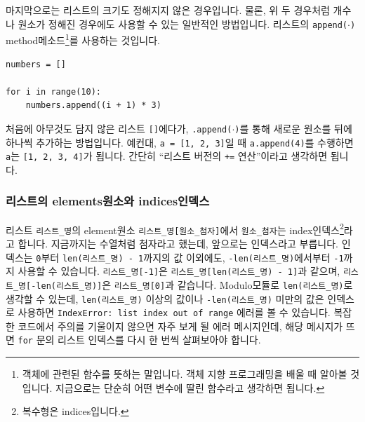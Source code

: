 \documentclass[../main.tex]{subfiles}
\begin{document}
마지막으로는 리스트의 크기도 정해지지 않은 경우입니다.
물론, 위 두 경우처럼 개수나 원소가 정해진 경우에도 사용할 수 있는 일반적인 방법입니다.
리스트의 \texttt{append($\cdot$)} method메소드\footnote{객체에 관련된 함수를 뜻하는 말입니다. 객체 지향 프로그래밍을 배울 때 알아볼 것입니다. 지금으로는 단순히 어떤 변수에 딸린 함수라고 생각하면 됩니다.}를 사용하는 것입니다.
\begin{verbatim}
numbers = []

for i in range(10):
    numbers.append((i + 1) * 3)
\end{verbatim}
처음에 아무것도 담지 않은 리스트 \texttt{[]}에다가, \texttt{.append($\cdot$)}를 통해 새로운 원소를 뒤에 하나씩 추가하는 방법입니다.
예컨대, \texttt{a = [1, 2, 3]}일 때 \texttt{a.append(4)}를 수행하면 \texttt{a}는 \texttt{[1, 2, 3, 4]}가 됩니다.
간단히 ``리스트 버전의 \texttt{+=} 연산''이라고 생각하면 됩니다.

\subsubsection{리스트의 elements원소와 indices인덱스}
리스트 \texttt{리스트\_명}의 element원소 \texttt{리스트\_명[원소\_첨자]}에서 \texttt{원소\_첨자}는 index인덱스\footnote{복수형은 indices입니다.}라고 합니다.
지금까지는 수열처럼 첨자라고 했는데, 앞으로는 인덱스라고 부릅니다.
인덱스는 \texttt{0}부터 \texttt{len(리스트\_명) - 1}까지의 값 이외에도, \texttt{-len(리스트\_명)}에서부터 \texttt{-1}까지 사용할 수 있습니다.
\texttt{리스트\_명[-1]}은 \texttt{리스트\_명[len(리스트\_명) - 1]}과 같으며, \texttt{리스트\_명[-len(리스트\_명)]}은 \texttt{리스트\_명[0]}과 같습니다.
Modulo모듈로 \texttt{len(리스트\_명)}로 생각할 수 있는데, \texttt{len(리스트\_명)} 이상의 값이나 \texttt{-len(리스트\_명)} 미만의 값은 인덱스로 사용하면 \texttt{IndexError: list index out of range} 에러를 볼 수 있습니다.
복잡한 코드에서 주의를 기울이지 않으면 자주 보게 될 에러 메시지인데, 해당 메시지가 뜨면 \texttt{for} 문의 리스트 인덱스를 다시 한 번씩 살펴보아야 합니다.
\end{document}
